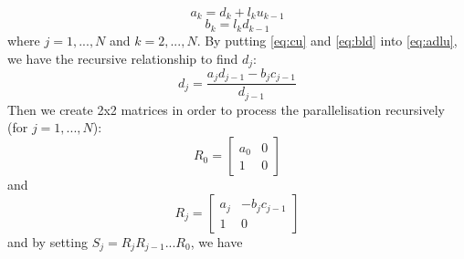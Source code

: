 \documentclass{article}
\begin{document}
                    \begin{equation}
                        \label{eq:adlu}
                        a_{k} = d_{k} + l_{k}u_{k-1}
                    \end{equation}
                    \begin{equation}
                        \label{eq:bld}
                        b_{k} = l_{k}d_{k-1}
                    \end{equation}
                    where $j = 1,..., N$ and $k=2,...,N$.
                    By putting \ref{eq:cu} and \ref{eq:bld} into \ref{eq:adlu}, we have the recursive
                    relationship to find $d_{j}$:
                    \begin{equation}
                        d_{j} = \frac{a_{j}d_{j-1}-b_{j}c_{j-1}}{d_{j-1}}
                    \end{equation}
                    Then we create 2x2 matrices in order to process the parallelisation recursively (for $j=1,...,N$):
                    \begin{equation}
                        R_{0}=
                        \begin{bmatrix}
                            a_{0} & 0 \\
                            1     & 0
                        \end{bmatrix}
                    \end{equation}
                    and
                    \begin{equation}
                        R_{j}=
                        \begin{bmatrix}
                            a_{j} & -b_{j}c_{j-1} \\
                            1     & 0
                        \end{bmatrix}
                    \end{equation}
                    and by setting $S_{j}=R_{j}R_{j-1}...R_{0}$, we have
\end{document}
